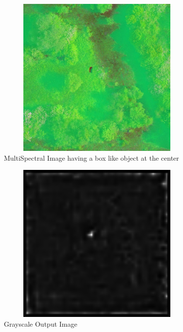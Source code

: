 \vspace{1cm}
\begin{figure}[h]
  \centering
  \includegraphics[width=0.9\textwidth,height=8cm]{sections/LBP/grass_0_rotated_0.jpg}
  \caption{MultiSpectral Image having a box like object at the center}
  \label{fig:figure_label}
\end{figure}
\vspace{2cm}

\begin{figure}[h]
  \centering
  \includegraphics[width=0.9\textwidth,height=8cm]{sections/LBP/grass_0_rotated_0.png}
  \caption{Grayscale Output Image}
  \label{fig:figure_label}
\end{figure}
\vspace{0.5cm}
\newpage

